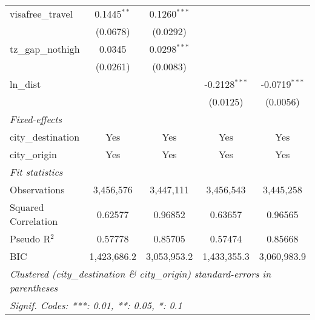 \begin{tabular}{lcccc}
   visafree\_travel                  & 0.1445$^{**}$              & 0.1260$^{***}$          &                            &   \\   
                                     & (0.0678)                   & (0.0292)                &                            &   \\   
   tz\_gap\_nothigh                  & 0.0345                     & 0.0298$^{***}$          &                            &   \\   
                                     & (0.0261)                   & (0.0083)                &                            &   \\   
   ln\_dist                          &                            &                         & -0.2128$^{***}$            & -0.0719$^{***}$\\   
                                     &                            &                         & (0.0125)                   & (0.0056)\\   
   \midrule
   \emph{Fixed-effects}\\
   city\_destination                 & Yes                        & Yes                     & Yes                        & Yes\\  
   city\_origin                      & Yes                        & Yes                     & Yes                        & Yes\\  
   \midrule
   \emph{Fit statistics}\\
   Observations                      & 3,456,576                  & 3,447,111               & 3,456,543                  & 3,445,258\\  
   Squared Correlation               & 0.62577                    & 0.96852                 & 0.63657                    & 0.96565\\  
   Pseudo R$^2$                      & 0.57778                    & 0.85705                 & 0.57474                    & 0.85668\\  
   BIC                               & 1,423,686.2                & 3,053,953.2             & 1,433,355.3                & 3,060,983.9\\  
   \midrule \midrule
   \multicolumn{5}{l}{\emph{Clustered (city\_destination \& city\_origin) standard-errors in parentheses}}\\
   \multicolumn{5}{l}{\emph{Signif. Codes: ***: 0.01, **: 0.05, *: 0.1}}\\
\end{tabular}
\par\endgroup


